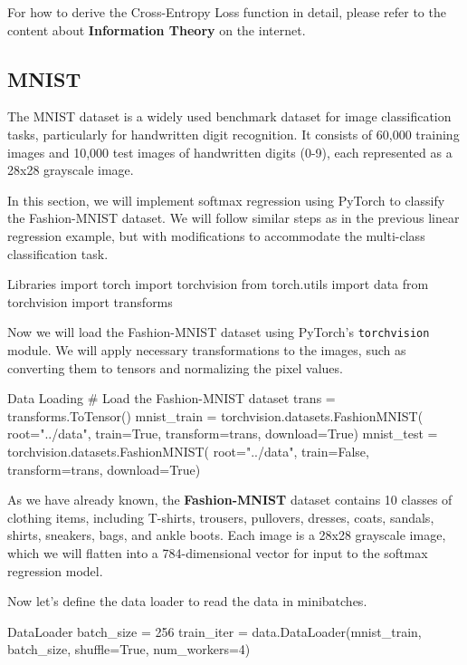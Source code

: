 For how to derive the Cross-Entropy Loss function in detail, please refer to the content about \textbf{Information Theory} on the internet.

\newpage

\subsection{MNIST}

The MNIST dataset is a widely used benchmark dataset for image classification tasks, particularly for handwritten digit recognition. It consists of 60,000 training images and 10,000 test images of handwritten digits (0-9), each represented as a 28x28 grayscale image.

In this section, we will implement softmax regression using PyTorch to classify the Fashion-MNIST dataset. We will follow similar steps as in the previous linear regression example, but with modifications to accommodate the multi-class classification task.

\begin{pythoncode}{Libraries}
import torch
import torchvision
from torch.utils import data
from torchvision import transforms
\end{pythoncode}

Now we will load the Fashion-MNIST dataset using PyTorch's \texttt{torchvision} module. We will apply necessary transformations to the images, such as converting them to tensors and normalizing the pixel values.

\begin{pythoncode}{Data Loading}
# Load the Fashion-MNIST dataset
trans = transforms.ToTensor()
mnist_train = torchvision.datasets.FashionMNIST(
    root="../data", train=True, transform=trans, download=True)
mnist_test = torchvision.datasets.FashionMNIST(
    root="../data", train=False, transform=trans, download=True)
\end{pythoncode}

As we have already known, the \textbf{Fashion-MNIST} dataset contains 10 classes of clothing items, including T-shirts, trousers, pullovers, dresses, coats, sandals, shirts, sneakers, bags, and ankle boots. Each image is a 28x28 grayscale image, which we will flatten into a 784-dimensional vector for input to the softmax regression model.

Now let's define the data loader to read the data in minibatches.

\begin{pythoncode}{DataLoader}
batch_size = 256
train_iter = data.DataLoader(mnist_train, batch_size, shuffle=True, num_workers=4)
\end{pythoncode}

